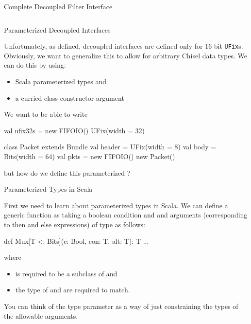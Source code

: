 \documentclass[xcolor=pdflatex,dvipsnames,table]{beamer}
\begin{document}
\begin{frame}[fragile]{Complete Decoupled Filter Interface}
\begin{columns}
\end{columns}
\end{frame}

\begin{frame}[fragile]{Parameterized Decoupled Interfaces}

Unfortunately, as defined, decoupled interfaces are defined only for 16 bit \verb+UFix+s.  
Obviously, we want to generalize this to allow for arbitrary Chisel data types.  
We can do this by using:
\begin{itemize}
\item Scala parameterized types and 
\item a curried class constructor argument
\end{itemize}

We want to be able to write
\begin{scala}
val ufix32s = new FIFOIO(){ UFix(width = 32) }

class Packet extends Bundle {
  val header = UFix(width = 8)
  val body   = Bits(width = 64)
}
val pkts    = new FIFOIO(){ new Packet() }
\end{scala}

\noindent
but how do we define this parameterized ?
\end{frame}

\begin{frame}[fragile]{Parameterized Types in Scala}

First we need to learn about parameterized types in Scala.
We can define a generic  function as taking a boolean condition and  and  arguments (corresponding to then and else expressions) of type  as follows:

\begin{scala}
def Mux[T <: Bits](c: Bool, con: T, alt: T): T { ... }
\end{scala}

\noindent
where 
\begin{itemize}
\item {} is required to be a subclass of  and 
\item the type of  and  are required to match.
\end{itemize}

\noindent
You can think of the type parameter as a way of just constraining the types of the allowable arguments.

\end{frame}
\end{document}
